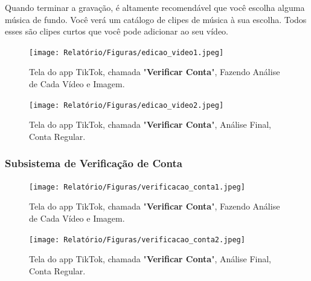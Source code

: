 Quando terminar a gravação, é altamente recomendável que você escolha alguma música de fundo. Você verá um catálogo de clipes de música à sua escolha. Todos esses são clipes curtos que você pode adicionar ao seu vídeo.



\begin{figure}[H]
    \centering
    \begin{minipage}{0.45\textwidth}
        \centering
        \texttt{[image: Relatório/Figuras/edicao\_video1.jpeg]}
        \caption{Tela do app TikTok, chamada "\textbf{Verificar Conta}", Fazendo Análise de Cada Vídeo e Imagem.}
        \label{fig:promover_publicacao1}
    \end{minipage}\hfill
    \begin{minipage}{0.45\textwidth}
        \centering
        \texttt{[image: Relatório/Figuras/edicao\_video2.jpeg]}
        \caption{Tela do app TikTok, chamada "\textbf{Verificar Conta}", Análise Final, Conta Regular.}
        \label{fig:promover_publicacao2}
    \end{minipage}
\end{figure}







\newpage
\subsubsection{Subsistema de Verificação de Conta}


\begin{figure}[H]
    \centering
    \begin{minipage}{0.45\textwidth}
        \centering
        \texttt{[image: Relatório/Figuras/verificacao\_conta1.jpeg]}
        \caption{Tela do app TikTok, chamada "\textbf{Verificar Conta}", Fazendo Análise de Cada Vídeo e Imagem.}
        \label{fig:promover_publicacao1}
    \end{minipage}\hfill
    \begin{minipage}{0.45\textwidth}
        \centering
        \texttt{[image: Relatório/Figuras/verificacao\_conta2.jpeg]}
        \caption{Tela do app TikTok, chamada "\textbf{Verificar Conta}", Análise Final, Conta Regular.}
        \label{fig:promover_publicacao2}
    \end{minipage}
\end{figure}













